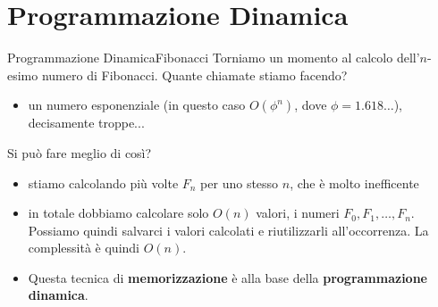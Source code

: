 \documentclass{beamer}
\begin{document}
%
%

\section{Programmazione Dinamica}
\begin{frame}{Programmazione Dinamica}{Fibonacci}
    Torniamo un momento al calcolo dell'$n$-esimo numero di Fibonacci. Quante chiamate stiamo facendo?
    \pause
    \begin{itemize}
        \item un numero esponenziale (in questo caso $O(\phi ^ n)$, dove $\phi = 1.618\dots$), decisamente troppe...
    \end{itemize}
    Si pu\`o fare meglio di cos\`i?
    \pause
    \begin{itemize}
        \item stiamo calcolando pi\`u volte $F_n$ per uno stesso $n$, che \`e molto inefficente
        \item in totale dobbiamo calcolare solo $O(n)$ valori, i numeri $F_0, F_1, \dots, F_n$. Possiamo quindi 
        salvarci i valori calcolati e riutilizzarli all'occorrenza. La complessit\`a \`e quindi $O(n)$.
        \item Questa tecnica di \textbf{memorizzazione} \`e alla base della \textbf{programmazione dinamica}.
    \end{itemize}
\end{frame}
\end{document}
